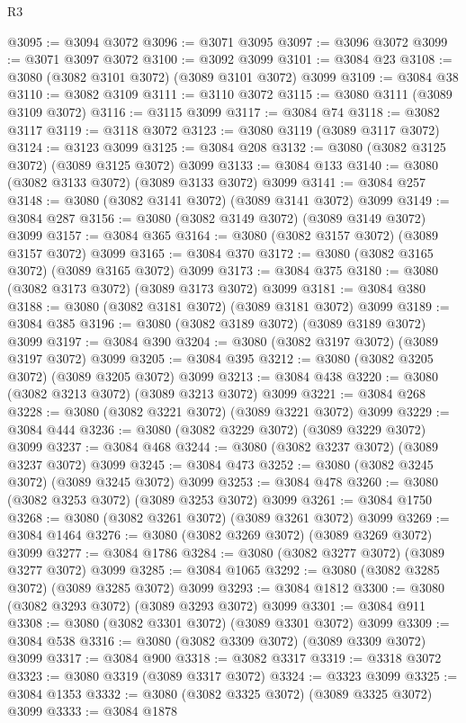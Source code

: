 \begin{lexlean}{R3}
\begin{coremodule}
@3095 := @3094 @3072
@3096 := @3071 @3095
@3097 := @3096 @3072
@3099 := @3071 @3097 @3072
@3100 := @3092 @3099
@3101 := @3084 @23
@3108 := @3080 (@3082 @3101 @3072) (@3089 @3101 @3072) @3099
@3109 := @3084 @38
@3110 := @3082 @3109
@3111 := @3110 @3072
@3115 := @3080 @3111 (@3089 @3109 @3072)
@3116 := @3115 @3099
@3117 := @3084 @74
@3118 := @3082 @3117
@3119 := @3118 @3072
@3123 := @3080 @3119 (@3089 @3117 @3072)
@3124 := @3123 @3099
@3125 := @3084 @208
@3132 := @3080 (@3082 @3125 @3072) (@3089 @3125 @3072) @3099
@3133 := @3084 @133
@3140 := @3080 (@3082 @3133 @3072) (@3089 @3133 @3072) @3099
@3141 := @3084 @257
@3148 := @3080 (@3082 @3141 @3072) (@3089 @3141 @3072) @3099
@3149 := @3084 @287
@3156 := @3080 (@3082 @3149 @3072) (@3089 @3149 @3072) @3099
@3157 := @3084 @365
@3164 := @3080 (@3082 @3157 @3072) (@3089 @3157 @3072) @3099
@3165 := @3084 @370
@3172 := @3080 (@3082 @3165 @3072) (@3089 @3165 @3072) @3099
@3173 := @3084 @375
@3180 := @3080 (@3082 @3173 @3072) (@3089 @3173 @3072) @3099
@3181 := @3084 @380
@3188 := @3080 (@3082 @3181 @3072) (@3089 @3181 @3072) @3099
@3189 := @3084 @385
@3196 := @3080 (@3082 @3189 @3072) (@3089 @3189 @3072) @3099
@3197 := @3084 @390
@3204 := @3080 (@3082 @3197 @3072) (@3089 @3197 @3072) @3099
@3205 := @3084 @395
@3212 := @3080 (@3082 @3205 @3072) (@3089 @3205 @3072) @3099
@3213 := @3084 @438
@3220 := @3080 (@3082 @3213 @3072) (@3089 @3213 @3072) @3099
@3221 := @3084 @268
@3228 := @3080 (@3082 @3221 @3072) (@3089 @3221 @3072) @3099
@3229 := @3084 @444
@3236 := @3080 (@3082 @3229 @3072) (@3089 @3229 @3072) @3099
@3237 := @3084 @468
@3244 := @3080 (@3082 @3237 @3072) (@3089 @3237 @3072) @3099
@3245 := @3084 @473
@3252 := @3080 (@3082 @3245 @3072) (@3089 @3245 @3072) @3099
@3253 := @3084 @478
@3260 := @3080 (@3082 @3253 @3072) (@3089 @3253 @3072) @3099
@3261 := @3084 @1750
@3268 := @3080 (@3082 @3261 @3072) (@3089 @3261 @3072) @3099
@3269 := @3084 @1464
@3276 := @3080 (@3082 @3269 @3072) (@3089 @3269 @3072) @3099
@3277 := @3084 @1786
@3284 := @3080 (@3082 @3277 @3072) (@3089 @3277 @3072) @3099
@3285 := @3084 @1065
@3292 := @3080 (@3082 @3285 @3072) (@3089 @3285 @3072) @3099
@3293 := @3084 @1812
@3300 := @3080 (@3082 @3293 @3072) (@3089 @3293 @3072) @3099
@3301 := @3084 @911
@3308 := @3080 (@3082 @3301 @3072) (@3089 @3301 @3072) @3099
@3309 := @3084 @538
@3316 := @3080 (@3082 @3309 @3072) (@3089 @3309 @3072) @3099
@3317 := @3084 @900
@3318 := @3082 @3317
@3319 := @3318 @3072
@3323 := @3080 @3319 (@3089 @3317 @3072)
@3324 := @3323 @3099
@3325 := @3084 @1353
@3332 := @3080 (@3082 @3325 @3072) (@3089 @3325 @3072) @3099
@3333 := @3084 @1878

\end{coremodule}
\end{lexlean}
